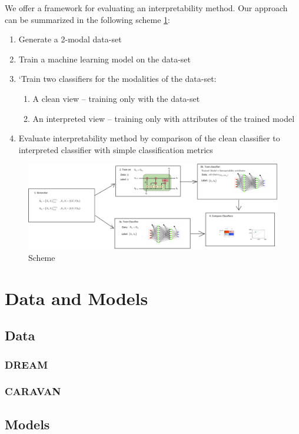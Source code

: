 \documentclass[12pt]{report}
\begin{document}
We offer a framework for evaluating an interpretability method. Our approach can be summarized in
the following scheme \ref{scheme}:
\begin{enumerate}
	\item Generate a 2-modal data-set
	\item Train a machine learning model on the data-set
	\item`Train two classifiers for the modalities of the data-set:
	\begin{enumerate}
		\item A clean view – training only with the data-set
		\item An interpreted view – training only with attributes of the trained model 	
    \end{enumerate}
	\item Evaluate interpretability method by comparison of the clean classifier to interpreted classifier
	with simple classification metrics		
\end{enumerate}
\begin{figure}[H]
	\centering\includegraphics[width=17cm]{scheme.png}
	\caption{Scheme}
	\label{scheme}
\end{figure}
\chapter{Data and Models} 
\section{Data}
\subsection{DREAM}
\subsection{CARAVAN}
\newpage
\section{Models}
\end{document}
